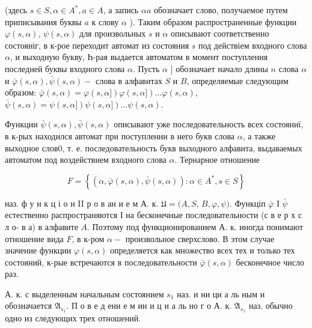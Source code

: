 \documentclass[10pt]{article}
\begin{document}
(здесь $s \in S, \alpha \in A^{*}, a \in A$, а запись $\alpha a$ обозначает слово, получаемое путем приписывания буквы $a$ к слову $\alpha$ ). Таким образом распространенные функции $\varphi(s, \alpha)$, $\psi(s, \alpha)$ для произвольных $s$ и $\alpha$ описывают соответственно состояніг, в к-рое переходит автомат из состояния $s$ под действіем входного слова $\alpha$, и выходную букву, Һ-рая выдается автоматом в момент поступления последней буквы входного слова $\alpha$. Пусть $\alpha$ ] обозначает начало длины $n$ слова $\alpha$ и $\bar{\varphi}(s, \alpha), \bar{\psi}(s, \alpha)-$ слова в алфавитах $S$ и $B$, определяемые следующим образом: $\bar{\varphi}(s, \alpha)=\varphi(s, \alpha]) \varphi(s, \alpha]) \ldots \varphi(s, \alpha)$, $\bar{\psi}(s, \alpha)=\psi(s, \alpha]) \psi(s, \alpha]) \ldots \psi(s, \alpha)$.



Функции $\bar{\psi}(s, \alpha), \bar{\psi}(s, \alpha)$ описывают уже последовательность всех состояниї, в к-рых находился автомат при поступлении в него букв слова $\alpha$, а также выходное слов0, т. е. последовательность букв выходного алфавита, выдаваемых автоматом под воздействием входного слова $\alpha$. Тернарное отношение



\[

F=\left\{(\alpha, \bar{\varphi}(s, \alpha), \bar{\psi}(s, \alpha)): \alpha \in A^{*}, s \in S\right\}

\]



наз. ф у н к ц і о н II р о в ан и е м А. к. $\mathfrak{U}=(A, S$, $B, \varphi, \psi)$. Функціп $\bar{\varphi}$ І $\bar{\psi}$ естественно распространяются І на бесконечные последовательности (с в е р х с л о- в а) в алфавите $A$. Поэтому под функционированием А. к. иногда понимают отношение вида $F$, в к-ром $\alpha-$ произвольное сверхслово. В этом случае значение функции $\varphi(s, \alpha)$ определяется как множество всех тех и только тех состояний, к-рые встречаются в последовательности $\bar{\varphi}(s, \alpha)$ бесконечное число раз.



А. к. с выделенным начальным состоянием $s_{1}$ наз. и ни ци а ль ным и обозначается $\mathfrak{A}_{s_{1}}$. П о в е д ени е м ин и ц и а ль но г о А. к. $\mathfrak{A}_{s_{1}}$ наз. обычно одно из следующих трех отношений.
\end{document}
